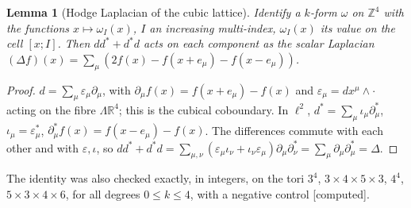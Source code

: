 \documentclass[11pt,a4paper]{article}
\theoremstyle{plain}
\newtheorem{lemma}[theorem]{Lemma}
\theoremstyle{definition}
\theoremstyle{remark}
\numberwithin{equation}{section}
\newcommand{\R}{\mathbb{R}}
\newcommand{\Z}{\mathbb{Z}}
\newcommand{\st}[1]{\textsf{[#1]}}
\begin{document}
\begin{lemma}[Hodge Laplacian of the cubic lattice]\label{lem:hodge}
Identify a $k$-form $\omega$ on $\Z^4$ with the functions $x\mapsto\omega_I(x)$, $I$ an increasing multi-index, $\omega_I(x)$ its value on the
cell $[x;I]$. Then $dd^*+d^*d$ acts on each component as the scalar Laplacian $(\Delta f)(x)=\sum_\mu(2f(x)-f(x+e_\mu)-f(x-e_\mu))$.
\end{lemma}
\begin{proof}
$d=\sum_\mu\varepsilon_\mu\partial_\mu$, with $\partial_\mu f(x)=f(x+e_\mu)-f(x)$ and $\varepsilon_\mu=dx^\mu\wedge\cdot$ acting on the fibre
$\Lambda\R^4$; this is the cubical coboundary. In $\ell^2$, $d^*=\sum_\mu\iota_\mu\partial_\mu^*$, $\iota_\mu=\varepsilon_\mu^*$,
$\partial_\mu^*f(x)=f(x-e_\mu)-f(x)$. The differences commute with each other and with $\varepsilon,\iota$, so
$dd^*+d^*d=\sum_{\mu,\nu}(\varepsilon_\mu\iota_\nu+\iota_\nu\varepsilon_\mu)\partial_\mu\partial_\nu^*=\sum_\mu\partial_\mu\partial_\mu^*=\Delta$.
\end{proof}
The identity was also checked exactly, in integers, on the tori $3^4$, $3\times4\times5\times3$, $4^4$, $5\times3\times4\times6$, for all
degrees $0\le k\le4$, with a negative control \st{computed}.
\end{document}
